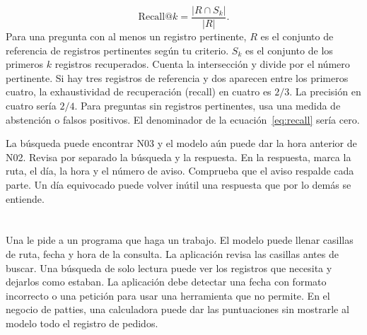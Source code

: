 \begin{equation}
 \mathrm{Recall@}k=\frac{|R\cap S_k|}{|R|}.
 \label{eq:recall}
\end{equation}
{Para una pregunta con al menos un registro pertinente, \(R\) es el conjunto de referencia de registros pertinentes según tu criterio. \(S_k\) es el conjunto de los primeros \(k\) registros recuperados. Cuenta la intersección y divide por el número pertinente. Si hay tres registros de referencia y dos aparecen entre los primeros cuatro, la exhaustividad de recuperación (recall) en cuatro es \(2/3\). La precisión en cuatro sería \(2/4\). Para preguntas sin registros pertinentes, usa una medida de abstención o falsos positivos. El denominador de la ecuación~\eqref{eq:recall} sería cero.}

{La búsqueda puede encontrar N03 y el modelo aún puede dar la hora anterior de N02. Revisa por separado la búsqueda y la respuesta. En la respuesta, marca la ruta, el día, la hora y el número de aviso. Comprueba que el aviso respalde cada parte. Un día equivocado puede volver inútil una respuesta que por lo demás se entiende.}

\section{}

{Una  le pide a un programa que haga un trabajo. El modelo puede llenar casillas de ruta, fecha y hora de la consulta. La aplicación revisa las casillas antes de buscar. Una búsqueda de solo lectura puede ver los registros que necesita y dejarlos como estaban. La aplicación debe detectar una fecha con formato incorrecto o una petición para usar una herramienta que no permite. En el negocio de patties, una calculadora puede dar las puntuaciones sin mostrarle al modelo todo el registro de pedidos.}

